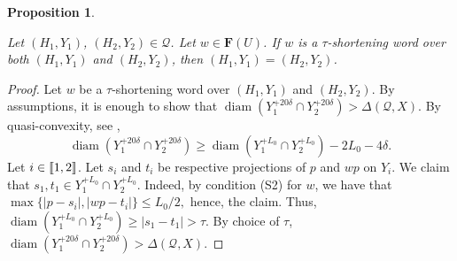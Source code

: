 \documentclass[leqno,a4paper,10pt]{amsart}
\theoremstyle{plain}
\newtheorem{prop}[thm]{Proposition}
\theoremstyle{definition}
\theoremstyle{remark}
\DeclareMathOperator{\diam}{diam}
\newcommand{\F}{\mathbf{F}}
\newcommand{\scrQ}{\mathscr{Q}}
\let\le\leqslant
\let\ge\geqslant
\newcommand{\zinterval}[2]{
	\mathchoice%
	{\left \llbracket #1, \cdots, #2 \right \rrbracket}%
	{\llbracket #1, #2 \rrbracket}%
	{\llbracket #1, #2 \rrbracket}%
	{\llbracket #1, #2 \rrbracket}%
}
\begin{document}
\begin{prop}
	
	\label{prop:shortening-fellow-travelling}
	
	Let $(H_1,Y_1)$, $(H_2,Y_2)\in\scrQ$. Let $w\in \F(U)$. If $w$ is a $\tau$-shortening word over both $(H_1,Y_1)$ and $(H_2,Y_2)$, then $(H_1,Y_1)=(H_2,Y_2)$.
\end{prop}

\begin{proof}
	Let $w$ be a $\tau$-shortening word over $(H_1,Y_1)$ and $(H_2,Y_2)$. By assumptions, it is enough to show that $\diam(Y_1^{+20\delta}\cap Y_2^{+20\delta})>\Delta(\scrQ,X)$. By quasi-convexity, see \cite[Lemma 2.2.2]{delzant_courbure_2008},
	$$\diam(Y_1^{+20\delta}\cap Y_2^{+20\delta})\ge \diam(Y_1^{+L_0}\cap Y_2^{+L_0})-2L_0-4\delta.$$	
	Let $i\in\zinterval{1}{2}$. Let $s_i$ and $t_i$ be respective projections of $p$ and $wp$ on $Y_i$. We claim that $s_1,t_1\in Y_1^{+L_0}\cap Y_2^{+L_0}$. Indeed, by condition (S2) for $w$, we have that 
	$\max\{|p-s_i|,|wp-t_i|\}\le L_0/2,$ hence, the claim. 
		Thus,
	$\diam(Y_1^{+L_0}\cap Y_2^{+L_0})\ge |s_1-t_1|>\tau.$
By choice of $\tau$, $\diam(Y_1^{+20\delta}\cap Y_2^{+20\delta})>\Delta(\scrQ,X)$.
\end{proof}
\end{document}
